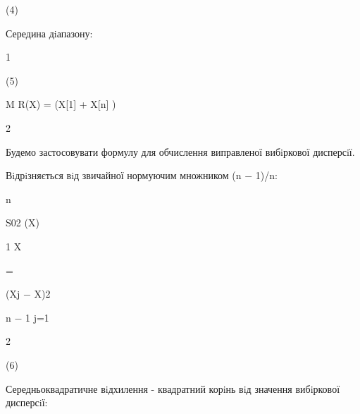 \documentclass[a4paper,portrait,12pt]{article}
\begin{document}
(4)





\begin{flushleft}
Середина дiапазону:
\end{flushleft}


1


(5)


\begin{flushleft}
M R(X) = (X[1] + X[n] )
\end{flushleft}


2


\begin{flushleft}
Будемо застосовувати формулу для обчислення виправленої вибiркової дисперсiї.
\end{flushleft}


\begin{flushleft}
Вiдрiзняється вiд звичайної нормуючим множником (n $-$ 1)/n:
\end{flushleft}


\begin{flushleft}
n
\end{flushleft}





\begin{flushleft}
S02 (X)
\end{flushleft}





\begin{flushleft}
1 X
\end{flushleft}


=


\begin{flushleft}
(Xj $-$ X)2
\end{flushleft}


\begin{flushleft}
n $-$ 1 j=1
\end{flushleft}


2





(6)





\begin{flushleft}
\newpage
Середньоквадратичне вiдхилення - квадратний корiнь вiд значення вибiркової дисперсiї:
\end{flushleft}
\end{document}
